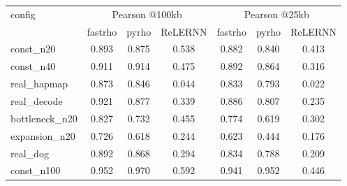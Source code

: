 \begin{tabular}{lcccccc}
\toprule
config & \multicolumn{3}{c}{Pearson @100kb} & \multicolumn{3}{c}{Pearson @25kb} \\
 & fastrho & pyrho & ReLERNN & fastrho & pyrho & ReLERNN \\
\midrule
const\_n20 & 0.893 & 0.875 & 0.538 & 0.882 & 0.840 & 0.413 \\
const\_n40 & 0.911 & 0.914 & 0.475 & 0.892 & 0.864 & 0.316 \\
real\_hapmap & 0.873 & 0.846 & 0.044 & 0.833 & 0.793 & 0.022 \\
real\_decode & 0.921 & 0.877 & 0.339 & 0.886 & 0.807 & 0.235 \\
bottleneck\_n20 & 0.827 & 0.732 & 0.455 & 0.774 & 0.619 & 0.302 \\
expansion\_n20 & 0.726 & 0.618 & 0.244 & 0.623 & 0.444 & 0.176 \\
real\_dog & 0.892 & 0.868 & 0.294 & 0.834 & 0.788 & 0.209 \\
const\_n100 & 0.952 & 0.970 & 0.592 & 0.941 & 0.952 & 0.446 \\
\bottomrule
\end{tabular}
